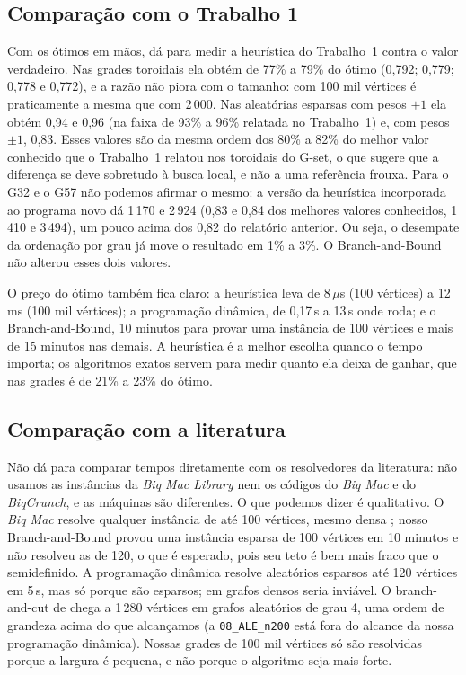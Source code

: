 \subsection{Comparação com o Trabalho 1}

Com os ótimos em mãos, dá para medir a heurística do Trabalho~1 contra o valor verdadeiro. Nas grades toroidais ela obtém de 77\% a 79\% do ótimo (0,792; 0,779; 0,778 e 0,772), e a razão não piora com o tamanho: com 100 mil vértices é praticamente a mesma que com 2\,000. Nas aleatórias esparsas com pesos $+1$ ela obtém 0,94 e 0,96 (na faixa de 93\% a 96\% relatada no Trabalho~1) e, com pesos $\pm1$, 0,83. Esses valores são da mesma ordem dos 80\% a 82\% do melhor valor conhecido que o Trabalho~1 relatou nos toroidais do G-set, o que sugere que a diferença se deve sobretudo à busca local, e não a uma referência frouxa. Para o G32 e o G57 não podemos afirmar o mesmo: a versão da heurística incorporada ao programa novo dá 1\,170 e 2\,924 (0,83 e 0,84 dos melhores valores conhecidos, 1\,410 e 3\,494), um pouco acima dos 0,82 do relatório anterior. Ou seja, o desempate da ordenação por grau já move o resultado em 1\% a 3\%. O Branch-and-Bound não alterou esses dois valores.

O preço do ótimo também fica claro: a heurística leva de 8\,$\mu$s (100 vértices) a 12\,ms (100 mil vértices); a programação dinâmica, de 0,17\,s a 13\,s onde roda; e o Branch-and-Bound, 10 minutos para provar uma instância de 100 vértices e mais de 15 minutos nas demais. A heurística é a melhor escolha quando o tempo importa; os algoritmos exatos servem para medir quanto ela deixa de ganhar, que nas grades é de 21\% a 23\% do ótimo.

\subsection{Comparação com a literatura}

Não dá para comparar tempos diretamente com os resolvedores da literatura: não usamos as instâncias da \emph{Biq Mac Library} nem os códigos do \emph{Biq Mac} e do \emph{BiqCrunch}, e as máquinas são diferentes. O que podemos dizer é qualitativo. O \emph{Biq Mac} resolve qualquer instância de até 100 vértices, mesmo densa \cite{Rendl et al. 2010}; nosso Branch-and-Bound provou uma instância esparsa de 100 vértices em 10 minutos e não resolveu as de 120, o que é esperado, pois seu teto é bem mais fraco que o semidefinido. A programação dinâmica resolve aleatórios esparsos até 120 vértices em 5\,s, mas só porque são esparsos; em grafos densos seria inviável. O branch-and-cut de \citet{Liers et al. 2003} chega a 1\,280 vértices em grafos aleatórios de grau 4, uma ordem de grandeza acima do que alcançamos (a \texttt{08\_ALE\_n200} está fora do alcance da nossa programação dinâmica). Nossas grades de 100 mil vértices só são resolvidas porque a largura é pequena, e não porque o algoritmo seja mais forte.


